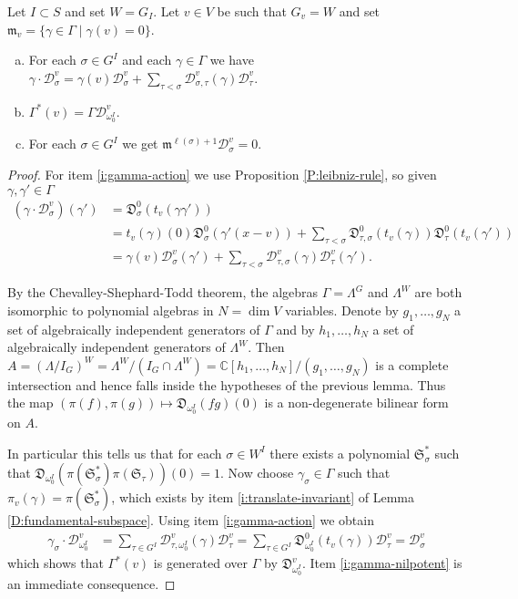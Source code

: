 \documentclass[11pt,fleqn]{article}
\newcommand\CC{\mathbb C}
\newcommand\D{\mathfrak D}
\newcommand\DD{\mathcal D}
\newcommand\m{\mathfrak m}
\renewcommand\SS{\mathfrak S}
\begin{document}
\begin{Proposition*}
Let $I \subset S$ and set $W= G_I$. Let $v \in V$ be such that $G_v = W$ and
set $\m_v = \{\gamma \in \Gamma \mid \gamma(v) = 0\}$.
\begin{enumerate}[(a)]
\item 
\label{i:gamma-action}
For each $\sigma \in G^I$ and each $\gamma \in \Gamma$ we have 
$\gamma \cdot \DD_\sigma^v = \gamma(v) \DD_\sigma^v + \sum_{\tau < \sigma} 
\DD_{\sigma, \tau}^v(\gamma) \DD_\tau^v$. 

\item
\label{i:gamma-cyclic} $\Gamma^*(v) = \Gamma \DD_{\omega_0^I}^v$.

\item 
\label{i:gamma-nilpotent}
For each $\sigma \in G^I$ we get $\m^{\ell(\sigma)+1} \DD_\sigma^v = 0$.
\end{enumerate}
\end{Proposition*}
\begin{proof}
For item \ref{i:gamma-action} we use Proposition 
\ref{P:leibniz-rule}, so given $\gamma, \gamma' \in \Gamma$
\begin{align*}
(\gamma \cdot \DD_\sigma^v)(\gamma')
	&= \D_\sigma^0(t_v(\gamma \gamma')) \\
	&= t_v(\gamma)(0) \D_\sigma^0(\gamma'(x-v)) 
		+ \sum_{\tau < \sigma} \D^0_{\tau, \sigma}(t_v(\gamma))
			\D_\tau^0(t_v(\gamma')) \\
	&= \gamma(v) \DD_\sigma^v(\gamma')
		+ \sum_{\tau < \sigma} \DD^v_{\tau, \sigma}(\gamma)
			\DD_\tau^v(\gamma'). 
\end{align*}

By the Chevalley-Shephard-Todd theorem, the algebras $\Gamma = \Lambda^G$ and 
$\Lambda^W$ are both isomorphic to polynomial algebras in $N = \dim V$ 
variables. Denote by $g_1, \ldots, g_N$ a set of algebraically independent 
generators of $\Gamma$ and by $h_1, \ldots, h_N$ a set of algebraically 
independent generators of $\Lambda^W$. Then $A = (\Lambda/I_G)^W = \Lambda^W / 
(I_G \cap \Lambda^W) = \CC[h_1, \ldots, h_N]/(g_1, \ldots, g_N)$ is a complete
intersection and hence falls inside the hypotheses of the previous lemma. Thus
the map $(\pi(f),\pi(g)) \mapsto \D_{\omega^I_0}(fg)(0)$ is a non-degenerate
bilinear form on $A$. 

In particular this tells us that for each $\sigma \in W^I$ there exists a 
polynomial $\SS_\sigma^*$ such that $\D_{\omega^I_0}(\pi(\SS_\sigma^*) 
\pi(\SS_\tau))(0) = 1$. Now choose $\gamma_\sigma \in \Gamma$ such that 
$\pi_v(\gamma) = \pi(\SS_\sigma^*)$, which exists by item 
\ref{i:translate-invariant} of Lemma \ref{D:fundamental-subspace}. Using item 
\ref{i:gamma-action} we obtain
\begin{align*}
\gamma_\sigma \cdot \DD_{\omega_0^I}^v
	&= \sum_{\tau \in G^I} \DD_{\tau, \omega^I_0}^v(\gamma) \DD_\tau^v
	= \sum_{\tau \in G^I} \D_{\omega^I_0}^0(t_v(\gamma)) \DD_\tau^v
	= \DD_\sigma^v
\end{align*}
which shows that $\Gamma^*(v)$ is generated over $\Gamma$ by 
$\D_{\omega^I_0}^v$. Item \ref{i:gamma-nilpotent} is an immediate consequence.
\end{proof}
\end{document}

